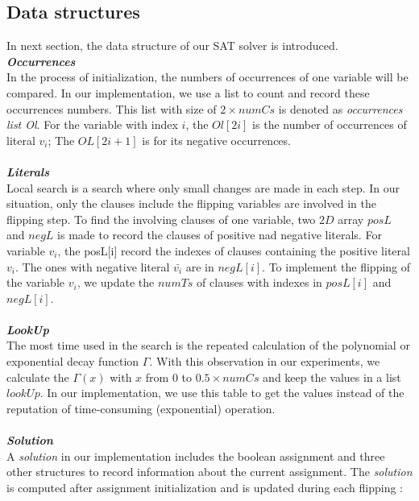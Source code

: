 \documentclass[12pt,a4paper,twoside]{scrartcl}
\numberwithin{equation}{section}
\begin{document}
\subsection{Data structures}
\label{subsec:Data structures}
In next section, the data structure of our SAT solver is introduced. \\
\emph{\textbf{Occurrences}}
\\
In the process of initialization, the numbers of occurrences of one variable will be compared. In our implementation, we use a list to count and record these occurrences numbers. This list with size of $2 \times numCs $ is denoted as \emph{occurrences list Ol}. For the variable with index $i$, the $Ol[2i]$ is the number of occurrences of literal $v_i$; The $OL[2i+1]$ is for its negative occurrences. \\
\\
\emph{\textbf{ Literals}}
\\
Local search is a search where only small changes are made in each step. In our situation, only the clauses include the flipping variables are involved in the flipping step. To find the involving clauses of one variable,  two $2D$ array $posL$ and $negL$ is made to record the clauses of positive nad negative literals. For variable $v_i $, the posL[i] record the indexes of clauses containing the positive literal $v_i$. The ones with negative literal $\bar{v_i}$ are in $negL[i]$. To implement the flipping of the variable $v_i$, we update the $numTs$ of clauses with indexes in $posL[i]$ and $negL[i]$.\\
\\
\emph{\textbf{LookUp}}
\\
The most time used in the search is the repeated  calculation  of the polynomial or exponential decay function $\Gamma$. With this observation in our experiments, we calculate the $\Gamma(x)$ with $x$ from $0$ to $0.5 \times numCs$ and keep the values in a list $lookUp$. In our implementation, we use this table to get the values instead of the reputation of time-consuming (exponential) operation.  \\
\\
\emph{\textbf{Solution}}
\\
A \emph{solution} in our implementation includes the boolean assignment and three other structures to record information about the current assignment. The \emph{solution} is computed after assignment initialization and is updated during each flipping :\\
\end{document}
